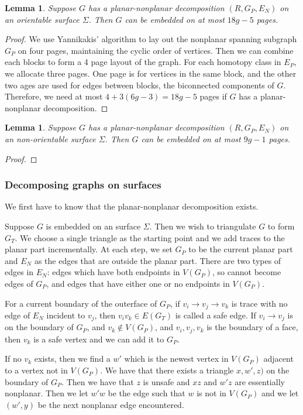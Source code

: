 \documentclass[]{article}
\newtheorem{lemma}[theorem]{Lemma}
\theoremstyle{definition}
\numberwithin{theorem}{section}
\numberwithin{equation}{section}
\begin{document}
\begin{lemma}\label{lem:planar_nonplanar_orientable}
	Suppose $G$ has a planar-nonplanar decomposition $(R, G_P, E_N)$ on an orientable surface $\Sigma$. Then $G$ can be embedded on at most $18g - 5$ pages.
\end{lemma}
\begin{proof}
	We use Yannikakis' algorithm to lay out the nonplanar spanning subgraph $G_P$ on four pages, maintaining the cyclic order of vertices. Then we can combine each blocks to form a 4 page layout of the graph. For each homotopy class in $E_P$, we allocate three pages. One page is for vertices in the same block, and the other two ages are used for edges between blocks, the biconnected components of $G$. Therefore, we need at most $4 + 3(6g - 3) = 18g-5$ pages if $G$ has a planar-nonplanar decomposition. 
\end{proof}

\begin{lemma}\label{lem:planar_nonplanar_nonorientable}
	Suppose $G$ has a planar-nonplanar decomposition $(R, G_P, E_N)$ on an non-orientable surface $\Sigma$. Then $G$ can be embedded on at most $9g - 1$ pages.
\end{lemma}
\begin{proof}
\end{proof}

\subsubsection{Decomposing graphs on surfaces}\label{sssec:Planar_nonplanar_decomp}
We first have to know that the planar-nonplanar decomposition exists. 

Suppose $G$ is embedded on an surface $\Sigma$. Then we wish to triangulate $G$ to form $G_T$. We choose a single triangle as the starting point and we add traces to the planar part incrementally. At each step, we set $G_P$ to be the current planar part and $E_N$ as the edges that are outside the planar part. There are two types of edges in $E_N$: edges which have both endpoints in $V(G_P)$, so cannot become edges of $G_P$, and edges that have either one or no endpoints in $V(G_P)$. 

For a current boundary of the outerface of $G_P$, if $v_i \rightarrow v_j \rightarrow v_k$ is trace with no edge of $E_N$ incident to $v_j$, then $v_iv_k \in E(G_T)$ is called a safe edge. If $v_i \rightarrow v_j$ is on the boundary of $G_P$, and $v_k \notin V(G_P)$, and $v_i,v_j,v_k$ is the boundary of a face, then $v_k$ is a safe vertex and we can add it to $G_P$. 

If no $v_k$ exists, then we find a $w'$ which is the newest vertex in $V(G_P)$ adjacent to a vertex not in $V(G_P)$. We have that there exists a triangle $x, w', z)$ on the boundary of $G_P$. Then we have that $z$ is unsafe and $xz$ and $w'z$ are essentially nonplanar. Then we let $w'w$ be the edge such that $w$ is not in $V(G_P)$ and we let $(w', y)$ be the next nonplanar edge encountered. 

\printbibliography
\end{document}
